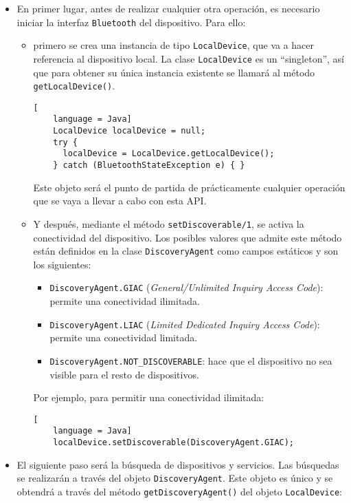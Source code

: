 \begin{itemize}
\item En primer lugar, antes de realizar cualquier otra operación, es necesario
iniciar la interfaz \texttt{Bluetooth} del dispositivo. Para ello:
  \begin{itemize}
  \item primero se crea una instancia de tipo \texttt{LocalDevice}, que va a 
  hacer referencia al dispositivo local. La clase \texttt{LocalDevice} es un 
  ``singleton'', así que para obtener su única instancia existente se llamará 
  al método \texttt{getLocalDevice()}.

  \begin{lstlisting}[
    language = Java]
    LocalDevice localDevice = null;
    try {
      localDevice = LocalDevice.getLocalDevice();
    } catch (BluetoothStateException e) { }
  \end{lstlisting}

  Este objeto será el punto de partida de prácticamente cualquier operación
  que se vaya a llevar a cabo con esta \acs{API}.

  \item Y después, mediante el método \texttt{setDiscoverable/1}, se activa la 
  conectividad del dispositivo. Los posibles valores que admite este método
  están definidos en la clase \texttt{DiscoveryAgent} como campos estáticos y
  son los siguientes:
    \begin{itemize}
    \item \texttt{DiscoveryAgent.GIAC} (\emph{General/Unlimited Inquiry Access
    Code}): permite una conectividad ilimitada.
    \item \texttt{DiscoveryAgent.LIAC} (\emph{Limited Dedicated Inquiry Access
    Code}): permite una conectividad limitada.
    \item \texttt{DiscoveryAgent.NOT\_DISCOVERABLE}: hace que el dispositivo
    no sea visible para el resto de dispositivos.
    \end{itemize}
  Por ejemplo, para permitir una conectividad ilimitada:

  \begin{lstlisting}[
    language = Java]
    localDevice.setDiscoverable(DiscoveryAgent.GIAC);
  \end{lstlisting}
  \end{itemize}

\item El siguiente paso será la búsqueda de dispositivos y servicios. Las
búsquedas se realizarán a través del objeto \texttt{DiscoveryAgent}. Este
objeto es único y se obtendrá a través del método \texttt{getDiscoveryAgent()}
del objeto \texttt{LocalDevice}:


\end{itemize}
